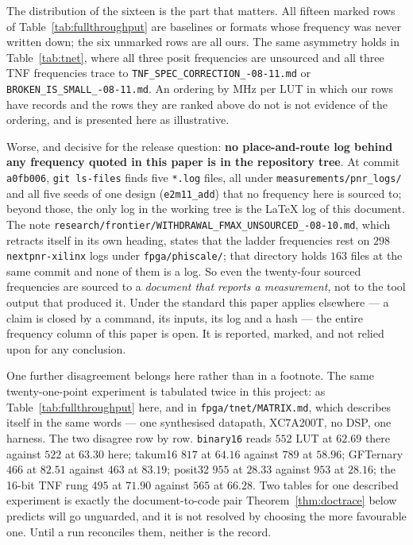 The distribution of the sixteen is the part that matters. All fifteen marked rows
of Table~\ref{tab:fullthroughput} are baselines or formats whose frequency was
never written down; the six unmarked rows are all ours. The same asymmetry holds in
Table~\ref{tab:tnet}, where all three posit frequencies are unsourced and all three
TNF frequencies trace to
\texttt{TNF\_\allowbreak SPEC\_\allowbreak CORRECTION\_-08-11.md} or
\texttt{BROKEN\_\allowbreak IS\_\allowbreak SMALL\_-08-11.md}. An ordering by MHz per LUT in which our
rows have records and the rows they are ranked above do not is not evidence of the
ordering, and is presented here as illustrative.

Worse, and decisive for the release question: \textbf{no place-and-route log behind
any frequency quoted in this paper is in the repository tree}. At commit \texttt{a0fb006}, \texttt{git ls-files} finds five \texttt{*.log} files, all under \texttt{measurements/pnr\_logs/} and all five seeds of one design (\texttt{e2m11\_add}) that no frequency here is sourced to; beyond those, the only log in the working tree is the \LaTeX{} log of this document. The note \texttt{research/\allowbreak frontier/\allowbreak WITHDRAWAL\_\allowbreak FMAX\_\allowbreak UNSOURCED\_-08-10.md}, which retracts itself in its own heading, states that the ladder frequencies
rest on $298$ \texttt{nextpnr-xilinx} logs under \texttt{fpga/phiscale/}; that
directory holds $163$ files at the same commit and none of them is a log. So even the twenty-four
sourced frequencies are sourced to a \emph{document that reports a measurement},
not to the tool output that produced it. Under the standard this paper applies
elsewhere --- a claim is closed by a command, its inputs, its log and a hash --- the
entire frequency column of this paper is open. It is reported, marked, and not
relied upon for any conclusion.

One further disagreement belongs here rather than in a footnote. The same
twenty-one-point experiment is tabulated twice in this project: as
Table~\ref{tab:fullthroughput} here, and in \texttt{fpga/tnet/MATRIX.md}, which
describes itself in the same words --- one synthesised datapath, XC7A200T, no DSP,
one harness. The two disagree row by row. \texttt{binary16} reads $552$ LUT at
$62.69$ there against $522$ at $63.30$ here; takum16 $817$ at $64.16$ against $789$
at $58.96$; GFTernary $466$ at $82.51$ against $463$ at $83.19$; posit32 $955$ at
$28.33$ against $953$ at $28.16$; the 16-bit TNF rung $495$ at $71.90$ against $565$
at $66.28$. Two tables for one described experiment is exactly the document-to-code
pair Theorem~\ref{thm:doctrace} below predicts will go unguarded, and it is not
resolved by choosing the more favourable one. Until a run reconciles them, neither
is the record.

